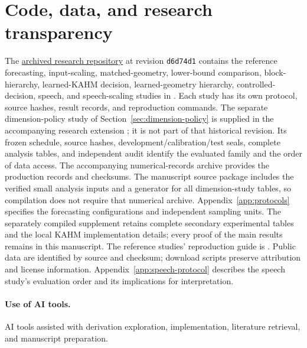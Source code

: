 \documentclass[twoside,11pt]{article}
\begin{document}
\section*{Code, data, and research transparency}
The \href{https://github.com/MohitKumarRostock/Kernel_Affine_Hull_Koopman_Machine/tree/d6d74d1953a4310b73065a556df816e5ab5e3ebc/extensions/certified_forecasting}{archived research repository}
at revision \texttt{d6d74d1} contains the reference forecasting,
input-scaling, matched-geometry, lower-bound comparison, block-hierarchy,
learned-KAHM decision, learned-geometry hierarchy, controlled-decision,
speech, and speech-scaling studies in
. Each study has its own protocol,
source hashes, result records, and reproduction commands.
The separate dimension-policy study of Section~\ref{sec:dimension-policy}
is supplied in the accompanying research extension
; it is not part of that historical
revision. Its frozen schedule, source hashes, development/calibration/test
seals, complete analysis tables, and independent audit identify the evaluated
family and the order of data access. The accompanying numerical-records
archive provides the production records and checksums. The manuscript source
package includes the verified small analysis inputs and a generator for all
dimension-study tables, so compilation does not require that numerical archive.
Appendix~\ref{app:protocols} specifies the forecasting configurations and
independent sampling units. The separately compiled supplement retains
complete secondary experimental tables and the local KAHM implementation
details; every proof of the main results remains in this manuscript.
The reference studies' reproduction guide is
.
Public data are identified by source and checksum; download scripts preserve
attribution and license information. Appendix~\ref{app:speech-protocol} describes the speech study's evaluation
order and its implications for interpretation.

\paragraph{Use of AI tools.}
AI tools assisted with derivation exploration, implementation, literature
retrieval, and manuscript preparation.

\appendix






\end{document}

